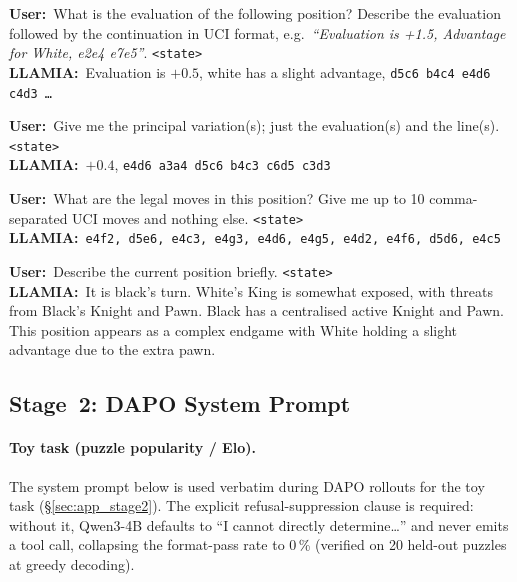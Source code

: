 \begin{tcolorbox}[notebox, title={Stage~1 Training Format}]
\small
\textbf{User:}~What is the evaluation of the following position?
Describe the evaluation followed by the continuation in UCI format, e.g.\
\emph{``Evaluation is +1.5, Advantage for White, e2e4 e7e5''}. \texttt{<state>}\\[3pt]
\textbf{LLAMIA:}~Evaluation is $+0.5$, white has a slight advantage,
\texttt{d5c6 b4c4 e4d6 c4d3 \ldots}

\tcbline
\textbf{User:}~Give me the principal variation(s); just the evaluation(s) and the
line(s). \texttt{<state>}\\[3pt]
\textbf{LLAMIA:}~$+0.4$, \texttt{e4d6 a3a4 d5c6 b4c3 c6d5 c3d3}

\tcbline
\textbf{User:}~What are the legal moves in this position?
Give me up to 10 comma-separated UCI moves and nothing else. \texttt{<state>}\\[3pt]
\textbf{LLAMIA:}~\texttt{e4f2, d5e6, e4c3, e4g3, e4d6, e4g5, e4d2, e4f6, d5d6, e4c5}

\tcbline
\textbf{User:}~Describe the current position briefly. \texttt{<state>}\\[3pt]
\textbf{LLAMIA:}~It is black's turn. White's King is somewhat exposed, with threats from
Black's Knight and Pawn. Black has a centralised active Knight and Pawn. This position
appears as a complex endgame with White holding a slight advantage due to the extra pawn.
\end{tcolorbox}

\subsection{Stage~2: DAPO System Prompt}
\label{sec:app_prompts_stage2}

\paragraph{Toy task (puzzle popularity / Elo).}
The system prompt below is used verbatim during DAPO rollouts for the toy task
(\S\ref{sec:app_stage2}).
The explicit refusal-suppression clause is required: without it, Qwen3-4B defaults to
``I cannot directly determine\ldots'' and never emits a tool call, collapsing the
format-pass rate to 0\,\% (verified on 20 held-out puzzles at greedy decoding).

